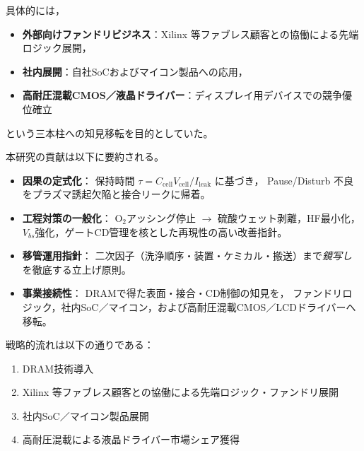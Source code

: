 \documentclass[conference]{IEEEtran}
\begin{document}
具体的には，
\begin{itemize}
  \item \textbf{外部向けファンドリビジネス}：Xilinx 等ファブレス顧客との協働による先端ロジック展開，
  \item \textbf{社内展開}：自社SoCおよびマイコン製品への応用，
  \item \textbf{高耐圧混載CMOS／液晶ドライバー}：ディスプレイ用デバイスでの競争優位確立
\end{itemize}
という三本柱への知見移転を目的としていた。

本研究の貢献は以下に要約される。
\begin{itemize}
  \item \textbf{因果の定式化}：
    保持時間 $\tau=C_{\mathrm{cell}}V_{\mathrm{cell}}/I_{\mathrm{leak}}$ に基づき，
    Pause/Disturb 不良をプラズマ誘起欠陥と接合リークに帰着。
  \item \textbf{工程対策の一般化}：
    O$_2$アッシング停止 $\rightarrow$ 硫酸ウェット剥離，HF最小化，
    $V_{bs}$強化，ゲートCD管理を核とした再現性の高い改善指針。
  \item \textbf{移管運用指針}：
    二次因子（洗浄順序・装置・ケミカル・搬送）まで\emph{鏡写し}を徹底する立上げ原則。
  \item \textbf{事業接続性}：
    DRAMで得た表面・接合・CD制御の知見を，
    ファンドリロジック，社内SoC／マイコン，および高耐圧混載CMOS／LCDドライバーへ移転。
\end{itemize}

戦略的流れは以下の通りである：
\begin{enumerate}
  \item DRAM技術導入
  \item Xilinx 等ファブレス顧客との協働による先端ロジック・ファンドリ展開
  \item 社内SoC／マイコン製品展開
  \item 高耐圧混載による液晶ドライバー市場シェア獲得
\end{enumerate}
\end{document}
